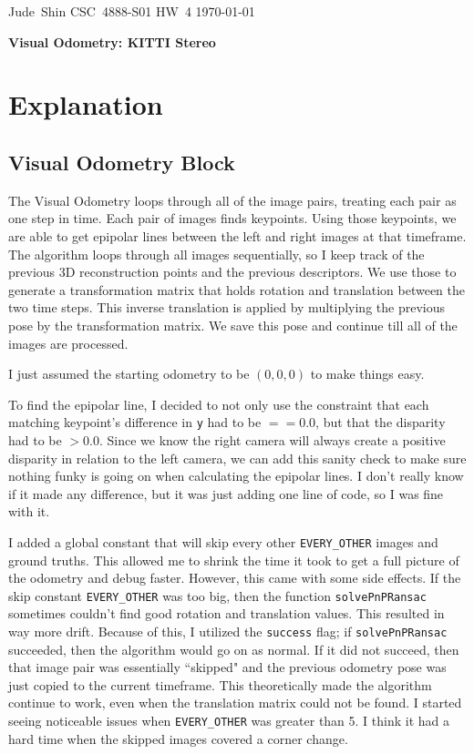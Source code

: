 \documentclass[11pt]{article}
\begin{document}
\hfill\vbox{\hbox{Jude Shin}
		\hbox{CSC 4888-S01}	
		\hbox{HW 4}	
		\hbox{\today}}\par

\bigskip
\centerline{\Large\bf Visual Odometry: KITTI Stereo}\par
\bigskip

\section{Explanation}

\subsection{Visual Odometry Block}

The Visual Odometry loops through all of the image pairs, treating each pair as one step in time.
Each pair of images finds keypoints.
Using those keypoints, we are able to get epipolar lines between the left and right images at that timeframe.
The algorithm loops through all images sequentially, so I keep track of the previous 3D reconstruction points and the previous descriptors.
We use those to generate a transformation matrix that holds rotation and translation between the two time steps.
This inverse translation is applied by multiplying the previous pose by the transformation matrix.
We save this pose and continue till all of the images are processed.

I just assumed the starting odometry to be $(0, 0, 0)$ to make things easy.

To find the epipolar line, I decided to not only use the constraint that each matching keypoint's difference in {\tt y} had to be $==0.0$, but that the disparity had to be $> 0.0$.
Since we know the right camera will always create a positive disparity in relation to the left camera, we can add this sanity check to make sure nothing funky is going on when calculating the epipolar lines.
I don't really know if it made any difference, but it was just adding one line of code, so I was fine with it.

I added a global constant that will skip every other {\tt EVERY\_OTHER} images and ground truths.
This allowed me to shrink the time it took to get a full picture of the odometry and debug faster.
However, this came with some side effects.
If the skip constant {\tt EVERY\_OTHER} was too big, then the function {\tt solvePnPRansac} sometimes couldn't find good rotation and translation values.
This resulted in way more drift.
Because of this, I utilized the {\tt success} flag; if {\tt solvePnPRansac} succeeded, then the algorithm would go on as normal.
If it did not succeed, then that image pair was essentially ``skipped" and the previous odometry pose was just copied to the current timeframe.
This theoretically made the algorithm continue to work, even when the translation matrix could not be found.
I started seeing noticeable issues when {\tt EVERY\_OTHER} was greater than 5.
I think it had a hard time when the skipped images covered a corner change.
\end{document}

